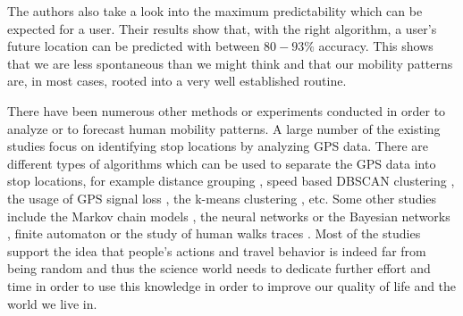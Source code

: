 The authors also take a look into the maximum predictability which can be
expected for a user. Their results show that, with the right algorithm, a user's
future location can be predicted with between $80-93\%$ accuracy. This shows
that we are less spontaneous than we might think and that our mobility patterns
are, in most cases, rooted into a very well established routine.

There have been numerous other methods or experiments conducted in order to
analyze or to forecast human mobility patterns. A large number of the existing
studies focus on identifying stop locations by analyzing GPS data. There are
different types of algorithms which can be used to separate the GPS data into
stop locations, for example distance grouping \cite{cuttone2014inferring}, speed
based DBSCAN clustering \cite{Palma:2008:CAD:1363686.1363886}, the usage of GPS
signal loss \cite{Cao:2010:MSS:1920841.1920968}, the k-means clustering
\cite{Ashbrook:2003:UGL:945305.945310}, etc. Some other studies include the
Markov chain models \cite{Ross09} \cite{Liu96}, the neural networks
\cite{Liou03} or the Bayesian networks \cite{Akoush07}, finite automaton
\cite{Petzold04} or the study of human walks traces \cite{5061995}
\cite{4509740}. Most of the studies support the idea that people's actions and
travel behavior is indeed far from being random and thus the science world needs
to dedicate further effort and time in order to use this knowledge in order to
improve our quality of life and the world we live in.
